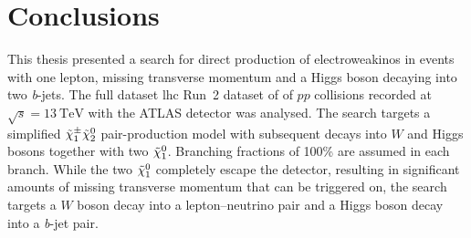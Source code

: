 

\chapter{Conclusions}

\ifpdf
    \graphicspath{{chapter-summary/Figs/Raster/}{chapter-summary/Figs/PDF/}{chapter-summary/Figs/}}
\else
    \graphicspath{{chapter-summary/Figs/Vector/}{chapter-summary/Figs/}}
\fi


This thesis presented a search for direct production of electroweakinos in events with one lepton, missing transverse momentum and a Higgs boson decaying into two \textit{b}-jets. The full dataset \gls{lhc} Run~2 dataset of \onethirtynineifb of $pp$ collisions recorded at $\sqrt{s} = \SI{13}{\TeV}$ with the ATLAS detector was analysed. The search targets a simplified $\tilde{\chi}_1^\pm\tilde{\chi}_2^0$ pair-production model with subsequent decays into $W$ and Higgs bosons together with two $\tilde{\chi}_1^0$. Branching fractions of 100\% are assumed in each branch. While the two $\tilde{\chi}_1^0$ completely escape the detector, resulting in significant amounts of missing transverse momentum that can be triggered on, the search targets a $W$ boson decay into a lepton--neutrino pair and a Higgs boson decay into a \textit{b}-jet pair.

